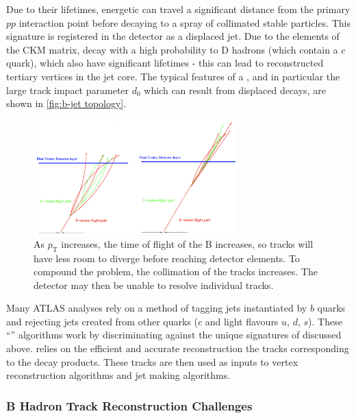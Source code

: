 Due to their lifetimes, energetic \bhadrons can travel a significant distance from the primary $pp$ interaction point before decaying to a spray of collimated stable particles. This signature is registered in the detector as a displaced jet. Due to the elements of the CKM matrix, \bhadrons decay with a high probability to D hadrons (which contain a $c$ quark), which also have significant lifetimes - this can lead to reconstructed tertiary vertices in the jet core. The typical features of a \bjet, and in particular the large track impact parameter $d_0$ which can result from displaced decays, are shown in \cref{fig:b-jet topology}.
%
\begin{figure}[!htbp]
    \centering
    \includegraphics[width=0.7\textwidth]{chapters/3.tracking/figs/high-pt-b-tracks.png}
    \caption{As \bhadron $p_\text{T}$ increases, the time of flight of the B increases, so tracks will have less room to diverge before reaching detector elements. To compound the problem, the collimation of the tracks increases. The detector may then be unable to resolve individual tracks.}
    \label{fig:B hadron tracking problems}
\end{figure}
%
Many ATLAS analyses rely on a method of tagging jets instantiated by $b$ quarks and rejecting jets created from other quarks ($c$ and light flavours $u$, $d$, $s$). These ``\btagging'' algorithms work by discriminating against the unique signatures of \bjets discussed above. \btagging relies on the efficient and accurate reconstruction the tracks corresponding to the \bhadron decay products. These tracks are then used as inputs to vertex reconstruction algorithms and jet making algorithms.


\subsubsection{B Hadron Track Reconstruction Challenges}\label{sec:B track reco challenges}

